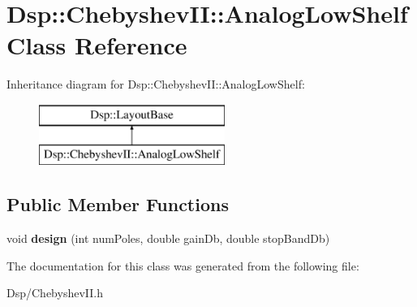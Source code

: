 \hypertarget{classDsp_1_1ChebyshevII_1_1AnalogLowShelf}{\section{Dsp\-:\-:Chebyshev\-I\-I\-:\-:Analog\-Low\-Shelf Class Reference}
\label{classDsp_1_1ChebyshevII_1_1AnalogLowShelf}
}
Inheritance diagram for Dsp\-:\-:Chebyshev\-I\-I\-:\-:Analog\-Low\-Shelf\-:\begin{figure}[H]
\begin{center}
\leavevmode
\includegraphics[height=2.000000cm]{classDsp_1_1ChebyshevII_1_1AnalogLowShelf}
\end{center}
\end{figure}
\subsection*{Public Member Functions}
\begin{DoxyCompactItemize}
\item 
\hypertarget{classDsp_1_1ChebyshevII_1_1AnalogLowShelf_adcd4da61d7a3c875b02e2304ab4ef624}{void {\bfseries design} (int num\-Poles, double gain\-Db, double stop\-Band\-Db)}\label{classDsp_1_1ChebyshevII_1_1AnalogLowShelf_adcd4da61d7a3c875b02e2304ab4ef624}

\end{DoxyCompactItemize}


The documentation for this class was generated from the following file\-:\begin{DoxyCompactItemize}
\item 
Dsp/Chebyshev\-I\-I.\-h\end{DoxyCompactItemize}
